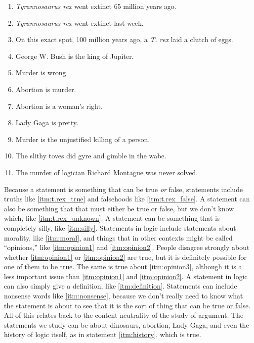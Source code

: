 \begin{enumerate}[label=(\alph*)]
\item \label{itm:t.rex_true}\emph{Tyrannosaurus rex} went extinct 65 million years ago. 
\item \label{itm:t.rex_false}\emph{Tyrannosaurus rex} went extinct last week.
\item \label{itm:t.rex_unknown}On this exact spot, 100  million years ago, a \emph{T. rex} laid a clutch of eggs. 
\item \label{itm:silly}George W. Bush is the king of Jupiter. 
\item \label{itm:moral}Murder is wrong. 
\item \label{itm:opinion1}Abortion is murder. 
\item \label{itm:opinion2}Abortion is a woman's right. 
\item \label{itm:opinion3}Lady Gaga is pretty.
\item \label{itm:definition}Murder is the unjustified killing of a person.
\item \label{itm:nonsense}The slithy toves did gyre and gimble in the wabe.
\item \label{itm:history}The murder of logician Richard Montague was never solved. 
\end{enumerate}

Because a statement is something that can be true \emph{or} false, statements include truths like \ref{itm:t.rex_true} and falsehoods like \ref{itm:t.rex_false}. A statement can also be something that that must either be true or false, but we don't know which, like \ref{itm:t.rex_unknown}. A statement can be something that is completely silly, like \ref{itm:silly}. Statements in logic include statements about morality, like \ref{itm:moral}, and things that in other contexts might be called ``opinions,'' like \ref{itm:opinion1} and \ref{itm:opinion2}. People disagree strongly about whether \ref{itm:opinion1} or \ref{itm:opinion2} are true, but it is definitely possible for one of them to be true. The same is true about \ref{itm:opinion3}, although it is a less important issue than \ref{itm:opinion1} and \ref{itm:opinion2}. A statement in logic can also simply give a definition, like \ref{itm:definition}.  Statements can include nonsense words like \ref{itm:nonsense}, because we don't really need to know what the statement is about to see that it is the sort of thing that can be true or false. All of this relates back to the content neutrality of the study of argument. The statements we study can be about dinosaurs, abortion, Lady Gaga, and even the history of logic itself, as in statement \ref{itm:history}, which is true.

